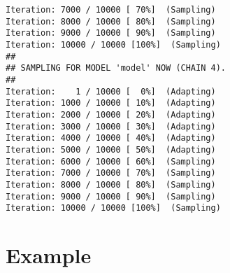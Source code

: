 \documentclass{article}\usepackage[]{graphicx}\usepackage[]{color}
\makeatletter
\newenvironment{kframe}{%
 \def\at@end@of@kframe{}%
 \ifinner\ifhmode%
  \def\at@end@of@kframe{\end{minipage}}%
  \begin{minipage}{\columnwidth}%
 \fi\fi%
 \def\FrameCommand##1{\hskip\@totalleftmargin \hskip-\fboxsep
 \colorbox{shadecolor}{##1}\hskip-\fboxsep
     \hskip-\linewidth \hskip-\@totalleftmargin \hskip\columnwidth}%
 \MakeFramed {\advance\hsize-\width
   \@totalleftmargin\z@ \linewidth\hsize
   \@setminipage}}%
 {\par\unskip\endMakeFramed%
 \at@end@of@kframe}
\newenvironment{knitrout}{}{} %
\makeatother
\begin{document}
\begin{knitrout}
\begin{kframe}
\begin{verbatim}
Iteration: 7000 / 10000 [ 70%]  (Sampling)
Iteration: 8000 / 10000 [ 80%]  (Sampling)
Iteration: 9000 / 10000 [ 90%]  (Sampling)
Iteration: 10000 / 10000 [100%]  (Sampling)
## 
## SAMPLING FOR MODEL 'model' NOW (CHAIN 4).
## 
Iteration:    1 / 10000 [  0%]  (Adapting)
Iteration: 1000 / 10000 [ 10%]  (Adapting)
Iteration: 2000 / 10000 [ 20%]  (Adapting)
Iteration: 3000 / 10000 [ 30%]  (Adapting)
Iteration: 4000 / 10000 [ 40%]  (Adapting)
Iteration: 5000 / 10000 [ 50%]  (Adapting)
Iteration: 6000 / 10000 [ 60%]  (Sampling)
Iteration: 7000 / 10000 [ 70%]  (Sampling)
Iteration: 8000 / 10000 [ 80%]  (Sampling)
Iteration: 9000 / 10000 [ 90%]  (Sampling)
Iteration: 10000 / 10000 [100%]  (Sampling)
\end{verbatim}
\end{kframe}
\end{knitrout}





\section{Example}
\end{document}
